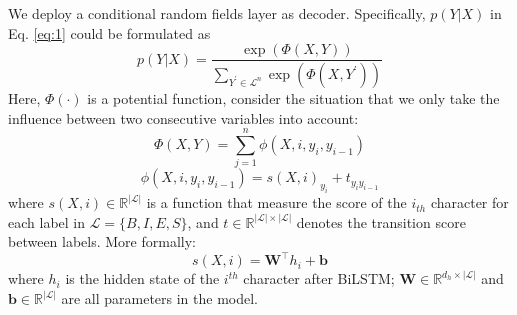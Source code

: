We deploy a conditional random fields layer as decoder. Specifically, $p(Y | X)$ in Eq. \eqref{eq:1} could be formulated as
\small
\begin{equation}
p(Y | X) = \frac{\exp(\Phi(X, Y))}{\sum_{Y^{'} \in \mathcal{L}^n}\exp(\Phi(X, Y^{'}))}
\end{equation}
\normalsize
\noindent Here, $\Phi(\cdot)$ is a potential function, consider the situation that we only take the influence between two consecutive variables into account:
\small
\begin{equation}
\Phi(X, Y) = \sum_{j=1}^{n}\phi(X, i, y_i, y_{i-1})
\end{equation}
\begin{equation}
\phi(X, i, y_i, y_{i-1}) = s(X, i)_{y_i} + t_{y_{i}y_{i-1}}
\end{equation}
\normalsize
\noindent where $s(X, i) \in \mathbb{R}^{|\mathcal{L}|}$ is a function that measure the score of the $i_{th}$ character for each label in $\mathcal{L} = \{B, I, E, S\}$, and $t \in \mathbb{R}^{|\mathcal{L}|\times|\mathcal{L}|}$ denotes the transition score between labels. More formally:
\small
\begin{equation}
s(X, i) = \mathbf{W}^\top h_i + \mathbf{b} 
\end{equation}
\normalsize
\noindent where $h_i$ is the hidden state of the $i^{th}$ character after BiLSTM; $\mathbf{W} \in \mathbb{R}^{d_h \times |\mathcal{L}|}$ and $\mathbf{b} \in \mathbb{R}^{|\mathcal{L}|}$ are all parameters in the model.
